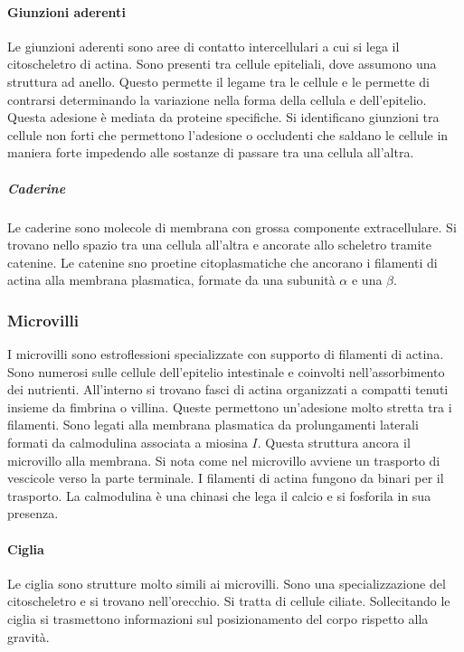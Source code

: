 			\paragraph{Giunzioni aderenti}
			Le giunzioni aderenti sono aree di contatto intercellulari a cui si lega il citoscheletro di actina.
			Sono presenti tra cellule epiteliali, dove assumono una struttura ad anello.
			Questo permette il legame tra le cellule e le permette di contrarsi determinando la variazione nella forma della cellula e dell'epitelio.
			Questa adesione \`e mediata da proteine specifiche.
			Si identificano giunzioni tra cellule non forti che permettono l'adesione o occludenti che saldano le cellule in maniera forte impedendo alle sostanze di passare tra una cellula all'altra.

				\subparagraph{Caderine}
				Le caderine sono molecole di membrana con grossa componente extracellulare.
				Si trovano nello spazio tra una cellula all'altra e ancorate allo scheletro tramite catenine.
				Le catenine sno proetine citoplasmatiche che ancorano i filamenti di actina alla membrana plasmatica, formate da una subunit\`a $\alpha$ e una $\beta$.

		\subsubsection{Microvilli}
		I microvilli sono estroflessioni specializzate con supporto di filamenti di actina.
		Sono numerosi sulle cellule dell'epitelio intestinale e coinvolti nell'assorbimento dei nutrienti.
		All'interno si trovano fasci di actina organizzati a compatti tenuti insieme da fimbrina o villina.
		Queste permettono un'adesione molto stretta tra i filamenti.
		Sono legati alla membrana plasmatica da prolungamenti laterali formati da calmodulina associata a miosina $I$.
		Questa struttura ancora il microvillo alla membrana.
		Si nota come nel microvillo avviene un trasporto di vescicole verso la parte terminale.
		I filamenti di actina fungono da binari per il trasporto.
		La calmodulina \`e una chinasi che lega il calcio e si fosforila in sua presenza.

			\paragraph{Ciglia}
			Le ciglia sono strutture molto simili ai microvilli.
			Sono una specializzazione del citoscheletro e si trovano nell'orecchio.
			Si tratta di cellule ciliate.
			Sollecitando le ciglia si trasmettono informazioni sul posizionamento del corpo rispetto alla gravit\`a.

